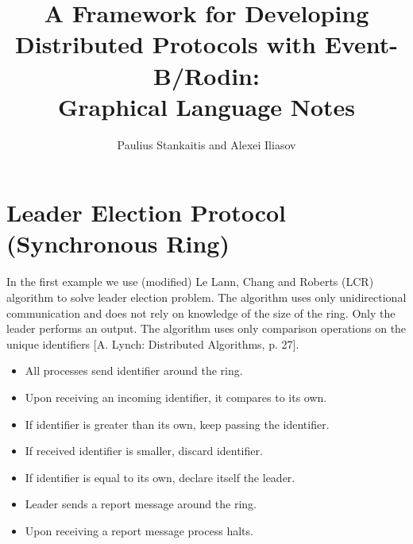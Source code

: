 \documentclass[10pt,a4paper]{report}
\begin{document}
	\title{A Framework for Developing Distributed Protocols with Event-B/Rodin: \vspace{.5cm} \\ \large Graphical Language Notes}
	\author{Paulius Stankaitis and Alexei Iliasov}
	\date{}
	\maketitle
	\section*{Leader Election Protocol (Synchronous Ring)}
	In the first example we use (modified) Le Lann, Chang and Roberts (LCR) algorithm to solve leader election problem. The algorithm uses only unidirectional communication and does not rely on knowledge of the size of the ring. Only the leader performs an output. The algorithm uses only comparison operations on the unique identifiers [A. Lynch: Distributed Algorithms, p. 27]. \\
	

		\begin{itemize}
			\item All processes send identifier around the ring.
			\item Upon receiving an incoming identifier, it compares to its own.
			\item If identifier is greater than its own, keep passing the identifier.
			\item If received identifier is smaller, discard identifier.
			\item If identifier is equal to its own, declare itself the leader.
			\item Leader sends a report message around the ring.
			\item Upon receiving a report message process halts.
		\end{itemize}
		
\end{document}
